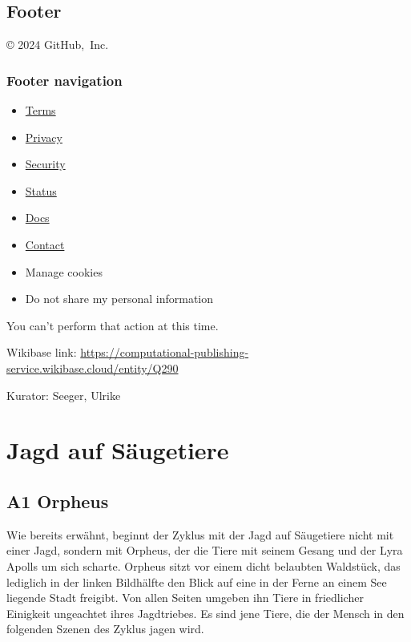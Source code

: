 \documentclass[
  letterpaper,
]{book}
\providecommand{\tightlist}{%
  \setlength{\itemsep}{0pt}\setlength{\parskip}{0pt}}\usepackage{longtable,booktabs,array}
\begin{document}
\section{Footer}\label{footer-2}

© 2024 GitHub,~Inc.

\subsection{Footer navigation}\label{footer-navigation-2}

\begin{itemize}
\tightlist
\item
  \href{https://docs.github.com/site-policy/github-terms/github-terms-of-service}{Terms}
\item
  \href{https://docs.github.com/site-policy/privacy-policies/github-privacy-statement}{Privacy}
\item
  \href{https://github.com/security}{Security}
\item
  \href{https://www.githubstatus.com/}{Status}
\item
  \href{https://docs.github.com/}{Docs}
\item
  \href{https://support.github.com?tags=dotcom-footer}{Contact}
\item
  Manage cookies
\item
  Do not share my personal information
\end{itemize}

You can't perform that action at this time.

Wikibase link:
\url{https://computational-publishing-service.wikibase.cloud/entity/Q290}

Kurator: Seeger, Ulrike


\chapter{Jagd auf Säugetiere}\label{jagd-auf-suxe4ugetiere}

\section{A1 Orpheus}\label{a1-orpheus}

Wie bereits erwähnt, beginnt der Zyklus mit der Jagd auf Säugetiere
nicht mit einer Jagd, sondern mit Orpheus, der die Tiere mit seinem
Gesang und der Lyra Apolls um sich scharte. Orpheus sitzt vor einem
dicht belaubten Waldstück, das lediglich in der linken Bildhälfte den
Blick auf eine in der Ferne an einem See liegende Stadt freigibt. Von
allen Seiten umgeben ihn Tiere in friedlicher Einigkeit ungeachtet ihres
Jagdtriebes. Es sind jene Tiere, die der Mensch in den folgenden Szenen
des Zyklus jagen wird.
\end{document}
